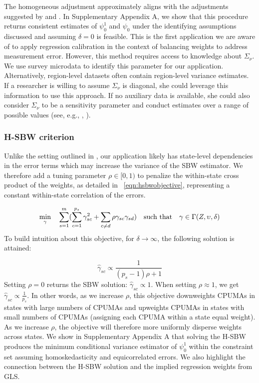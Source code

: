 \documentclass[aoas]{imsart}
\theoremstyle{plain}
\theoremstyle{remark}
\begin{document}
The homogeneous adjustment approximately aligns with the adjustments suggested by \citet{carroll2006measurement} and \citet{gleser1992importance}. In Supplementary Appendix A, we show that this procedure returns consistent estimates of $\psi_0^1$ and $\psi_0$ under the identifying assumptions discussed and assuming $\delta = 0$ is feasible. This is the first application we are aware of to apply regression calibration in the context of balancing weights to address measurement error. However, this method requires access to knowledge about $\Sigma_{\nu}$. We use survey microdata to identify this parameter for our application. Alternatively, region-level datasets often contain region-level variance estimates. If a researcher is willing to assume $\Sigma_{\nu}$ is diagonal, she could leverage this information to use this approach. If no auxiliary data is available, she could also consider $\Sigma_{\nu}$ to be a sensitivity parameter and conduct estimates over a range of possible values (see, e.g., \citet{huque2014impact}, \citet{illenberger2020impact}). 

\subsubsection{H-SBW criterion}\label{sssec:hsbw}

Unlike the setting outlined in \citet{zubizarreta2015stable}, our application likely has state-level dependencies in the error terms which may increase the variance of the SBW estimator. We therefore add a tuning parameter $\rho \in [0, 1)$ to penalize the within-state cross product of the weights, as detailed in ~\eqref{eqn:hsbwobjective}, representing a constant within-state correlation of the errors.

\begin{equation}\label{eqn:hsbwobjective}
\min_{\gamma} \quad \sum_{s=1}^{m}(\sum_{c = 1}^{p_s}\gamma_{sc}^2 + \sum_{c \ne d}\rho \gamma_{sc}\gamma_{sd}) \quad \text{such that} \quad \gamma \in \Gamma(Z, \upsilon, \delta)\\
\end{equation}
To build intuition about this objective, for $\delta \to \infty$, the following solution is attained:

\begin{equation}\label{eqn:sbwsol}
\hat{\gamma}_{sc} \propto \frac{1}{(p_s - 1)\rho + 1}
\end{equation}
Setting $\rho = 0$ returns the SBW solution: $\hat{\gamma}_{sc} \propto 1$. When setting $\rho \approx 1$, we get $\hat{\gamma}_{sc} \propto \frac{1}{p_s}$. In other words, as we increase $\rho$, this objective downweights CPUMAs in states with large numbers of CPUMAs and upweights CPUMAs in states with small numbers of CPUMAs (assigning each CPUMA within a state equal weight). As we increase $\rho$, the objective will therefore more uniformly disperse weights across states. We show in Supplementary Appendix A that solving the H-SBW produces the minimum conditional variance estimator of $\psi_0^1$ within the constraint set assuming homoskedasticity and equicorrelated errors. We also highlight the connection between the H-SBW solution and the implied regression weights from GLS.
\end{document}
